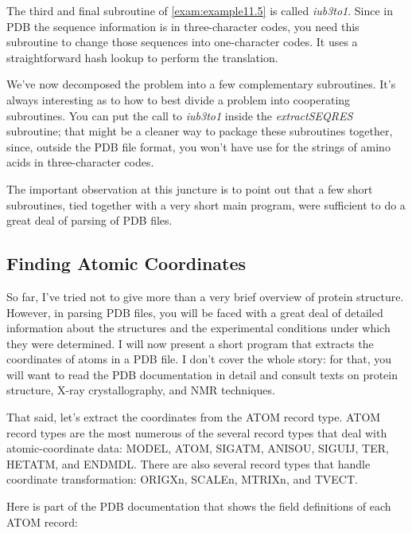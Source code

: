 The third and final subroutine of \autoref{exam:example11.5} is called \textit{iub3to1}. Since in PDB the sequence information is in three-character codes, you need this subroutine to change those sequences into one-character codes. It uses a straightforward hash lookup to perform the translation.

We've now decomposed the problem into a few complementary subroutines.  It's always interesting as to how to best divide a problem into cooperating subroutines. You can put the call to \textit{iub3to1} inside the \textit{extractSEQRES} subroutine; that might be a cleaner way to package these subroutines together, since, outside the PDB file format, you won't have use for the strings of amino acids in three-character codes.

The important observation at this juncture is to point out that a few short subroutines, tied together with a very short main program, were sufficient to do a great deal of parsing of PDB files. 

\subsection{Finding Atomic Coordinates}
So far, I've tried not to give more than a very brief overview of protein structure. However, in parsing PDB files, you will be faced with a great deal of detailed information about the structures and the experimental conditions under which they were determined. I will now present a short program that extracts the coordinates of atoms in a PDB file. I don't cover the whole story: for that, you will want to read the PDB documentation in detail and consult texts on protein structure, X-ray crystallography, and NMR techniques.

That said, let's extract the coordinates from the ATOM record type. ATOM record types are the most numerous of the several record types that deal with atomic-coordinate data: MODEL, ATOM, SIGATM, ANISOU, SIGUIJ, TER, HETATM, and ENDMDL. There are also several record types that handle coordinate transformation: ORIGXn, SCALEn, MTRIXn, and TVECT.

Here is part of the PDB documentation that shows the field definitions of each ATOM record: 

